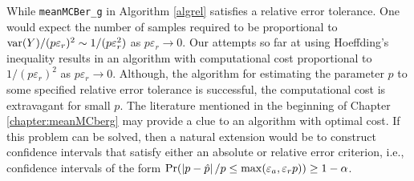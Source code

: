 \documentclass{iitthesis}
\theoremstyle{definition}
\begin{document}
While {\tt meanMCBer\_g} in Algorithm \ref{algrel} satisfies a relative error tolerance. One would expect the number of samples required to be proportional to $\operatorname{var}(Y)/(p \varepsilon_r)^2 \sim 1/(p \varepsilon_r^2)$ as $p\varepsilon_r \to 0$.  Our attempts so far at using Hoeffding's inequality results in an algorithm with computational cost proportional to $1/(p \varepsilon_r)^2$ as $p\varepsilon_r \to 0$.  Although, the algorithm for estimating the parameter $p$ to some specified relative error tolerance is successful, the computational cost is extravagant for small $p$. The literature mentioned in the beginning of Chapter \ref{chapter:meanMCberg} may provide a clue to an algorithm with optimal cost.  If this problem can be solved, then a natural extension would be to construct confidence intervals that satisfy either an absolute or relative error criterion, i.e., confidence intervals of the form $\Pr(\left \lvert p-\hat{p} \right \rvert/p\leq \max(\varepsilon_a, \varepsilon_r p)) \geq 1-\alpha$.
%
%
%
%
%
\end{document}
